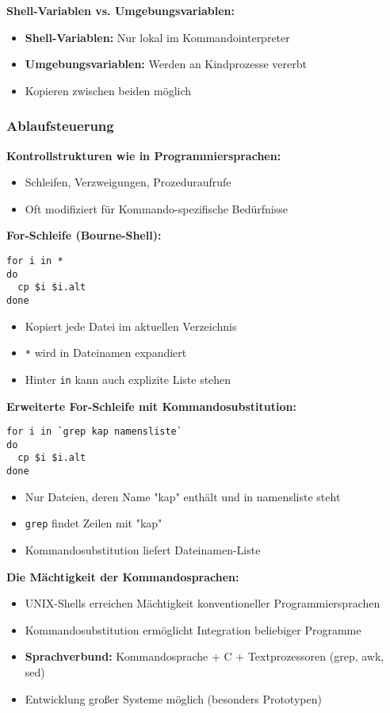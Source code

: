 \documentclass[9pt,a4paper]{extarticle}
\begin{document}
\begin{multicols*}{2}
\textbf{Shell-Variablen vs. Umgebungsvariablen:}
\begin{itemize}
\item \textbf{Shell-Variablen:} Nur lokal im Kommandointerpreter
\item \textbf{Umgebungsvariablen:} Werden an Kindprozesse vererbt
\item Kopieren zwischen beiden möglich
\end{itemize}

\subsubsection{Ablaufsteuerung}
\textbf{Kontrollstrukturen wie in Programmiersprachen:}
\begin{itemize}
\item Schleifen, Verzweigungen, Prozeduraufrufe
\item Oft modifiziert für Kommando-spezifische Bedürfnisse
\end{itemize}

\textbf{For-Schleife (Bourne-Shell):}
\begin{verbatim}
for i in *
do
  cp $i $i.alt
done
\end{verbatim}
\begin{itemize}
\item Kopiert jede Datei im aktuellen Verzeichnis
\item \texttt{*} wird in Dateinamen expandiert
\item Hinter \texttt{in} kann auch explizite Liste stehen
\end{itemize}

\textbf{Erweiterte For-Schleife mit Kommandosubstitution:}
\begin{verbatim}
for i in `grep kap namensliste`
do
  cp $i $i.alt
done
\end{verbatim}
\begin{itemize}
\item Nur Dateien, deren Name "kap" enthält und in namensliste steht
\item \texttt{grep} findet Zeilen mit "kap"
\item Kommandosubstitution liefert Dateinamen-Liste
\end{itemize}

\textbf{Die Mächtigkeit der Kommandosprachen:}
\begin{itemize}
\item UNIX-Shells erreichen Mächtigkeit konventioneller Programmiersprachen
\item Kommandosubstitution ermöglicht Integration beliebiger Programme
\item \textbf{Sprachverbund:} Kommandosprache + C + Textprozessoren (grep, awk, sed)
\item Entwicklung großer Systeme möglich (besonders Prototypen)
\end{itemize}


\end{multicols*}
\end{document}
